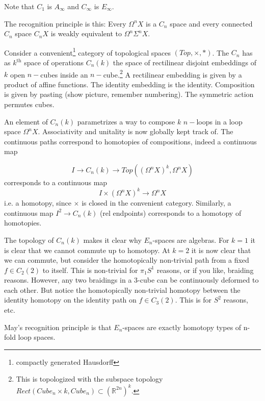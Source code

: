 Note that $C_1$ is $A_\infty$ and $C_\infty$ is $E_\infty$.

The recognition principle is this: Every $\Omega^nX$ is a $C_n$ space and every connected $C_n$ space $C_nX$ is weakly equivalent to $\Omega^n \Sigma^n X$.

\begin{example}
    Consider a convenient\footnote{compactly generated Hausdorff} category of topological spaces $(Top,\times,*)$. The  $C_n$ has as $k^{\text{th}}$ space of operations $C_n(k)$ the space of rectilinear disjoint embeddings of $k$ open $n-$cubes inside an $n-$cube.\footnote{This is topologized with the subspace topology $Rect(Cube_n\times k,Cube_n)\subset (\mathbb{R}^{2n})^k$.} A rectilinear embedding is given by a product of affine functions. The identity embedding is the identity. Composition is given by pasting (show picture, remember numbering). The symmetric action permutes cubes.   

    An element of $C_n(k)$ parametrizes a way to compose $k$ $n-$loops in a loop space $\Omega^n X$. Associativity and unitality is now globally kept track of. The continuous paths correspond to homotopies of compositions, indeed a continuous map

    $$I\rightarrow C_n(k)\rightarrow Top((\Omega^nX)^k,\Omega^nX)$$
    corresponds to a continuous map $$I\times (\Omega^nX)^k\rightarrow \Omega^nX$$ i.e. a homotopy, since $\times$ is closed in the convenient category. Similarly, a continuous map $I^2\rightarrow C_n(k)$ (rel endpoints) corresponds to a homotopy of homotopies.

    The topology of $C_n(k)$ makes it clear why $E_n$-spaces are algebras. For $k=1$ it is clear that we cannot commute up to homotopy. At $k=2$ it is now clear that we can commute, but consider the homotopically non-trivial path from a fixed $f\in C_2(2)$ to itself. This is non-trivial for $\pi_1S^1$ reasons, or if you like, braiding reasons. However, any two braidings in a 3-cube can be continuously deformed to each other. But notice the homotopically non-trivial homotopy between the identity homotopy on the identity path on $f\in C_3(2)$. This is for $S^2$ reasons, etc.
    
    May's recognition principle is that $E_n$-spaces are exactly homotopy types of n-fold loop spaces.
\end{example}


